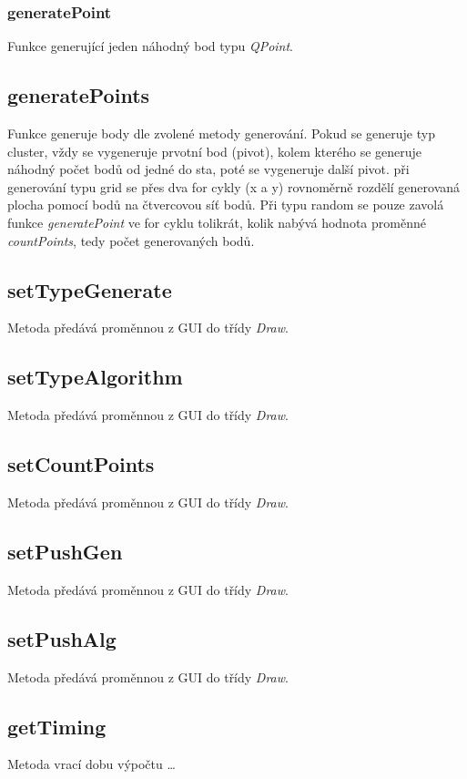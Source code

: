 \documentclass{article}
\begin{document}
\subsubsection{generatePoint}
Funkce generující jeden náhodný bod typu\emph{ QPoint}.

\subsection{generatePoints}
Funkce generuje body dle zvolené metody generování. Pokud se generuje typ cluster, vždy se vygeneruje prvotní bod (pivot), kolem kterého se generuje náhodný počet bodů od jedné do sta, poté se vygeneruje další pivot. při generování typu grid se přes dva for cykly (x a y) rovnoměrně rozdělí generovaná plocha pomocí bodů na čtvercovou síť bodů. Při typu random se pouze zavolá funkce \emph{generatePoint} ve for cyklu tolikrát, kolik nabývá hodnota proměnné \emph{countPoints}, tedy počet generovaných bodů.
\subsection{setTypeGenerate}
Metoda předává proměnnou z GUI do třídy \emph{Draw}.

\subsection{setTypeAlgorithm}
Metoda předává proměnnou z GUI do třídy \emph{Draw}.

\subsection{setCountPoints}
Metoda předává proměnnou z GUI do třídy \emph{Draw}.

\subsection{setPushGen}
Metoda předává proměnnou z GUI do třídy \emph{Draw}.

\subsection{setPushAlg}
Metoda předává proměnnou z GUI do třídy \emph{Draw}.

\subsection{getTiming}
Metoda vrací dobu výpočtu \ldots
\end{document}
